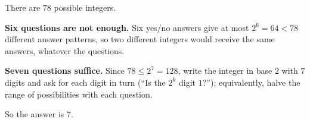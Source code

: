 There are $78$ possible integers.

\textbf{Six questions are not enough.} Six yes/no answers give at most $2^6=64<78$ different answer patterns, so two different integers would receive the same answers, whatever the questions.

\textbf{Seven questions suffice.} Since $78\le2^7=128$, write the integer in base $2$ with $7$ digits and ask for each digit in turn (``Is the $2^k$ digit $1$?''); equivalently, halve the range of possibilities with each question.

So the answer is $\boxed{7}$.

